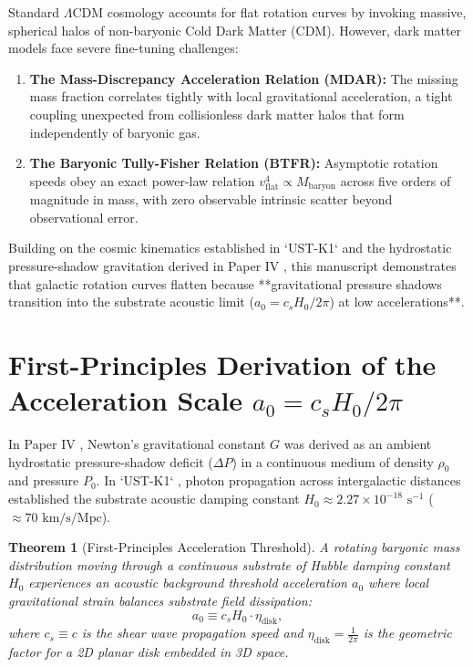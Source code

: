 \documentclass[11pt,a4paper]{article}
\newtheorem{thm}{Theorem}
\begin{document}
	Standard $\Lambda\text{CDM}$ cosmology accounts for flat rotation curves by invoking massive, spherical halos of non-baryonic Cold Dark Matter (CDM). However, dark matter models face severe fine-tuning challenges:
	\begin{enumerate}
		\item \textbf{The Mass-Discrepancy Acceleration Relation (MDAR):} The missing mass fraction correlates tightly with local gravitational acceleration, a tight coupling unexpected from collisionless dark matter halos that form independently of baryonic gas.
		\item \textbf{The Baryonic Tully-Fisher Relation (BTFR):} Asymptotic rotation speeds obey an exact power-law relation $v_{\text{flat}}^4 \propto M_{\text{baryon}}$ across five orders of magnitude in mass, with zero observable intrinsic scatter beyond observational error.
	\end{enumerate}
	
	Building on the cosmic kinematics established in `UST-K1` \cite{USTK1} and the hydrostatic pressure-shadow gravitation derived in Paper IV \cite{PaperIV}, this manuscript demonstrates that galactic rotation curves flatten because **gravitational pressure shadows transition into the substrate acoustic limit ($a_0 = c_s H_0 / 2\pi$) at low accelerations**.
	
	\section{First-Principles Derivation of the Acceleration Scale $a_0 = c_s H_0 / 2\pi$}
	\label{sec:a0_derivation}
	
	In Paper IV \cite{PaperIV}, Newton's gravitational constant $G$ was derived as an ambient hydrostatic pressure-shadow deficit ($\Delta P$) in a continuous medium of density $\rho_0$ and pressure $P_0$. In `UST-K1` \cite{USTK1}, photon propagation across intergalactic distances established the substrate acoustic damping constant $H_0 \approx 2.27 \times 10^{-18} \text{ s}^{-1}$ ($\approx 70 \text{ km/s/Mpc}$).
	
	\begin{thm}[First-Principles Acceleration Threshold]
		\label{thm:a0_derivation}
		A rotating baryonic mass distribution moving through a continuous substrate of Hubble damping constant $H_0$ experiences an acoustic background threshold acceleration $a_0$ where local gravitational strain balances substrate field dissipation:
		\begin{equation}
			a_0 \equiv c_s H_0 \cdot \eta_{\text{disk}},
			\label{eq:a0_first_principles_def}
		\end{equation}
		where $c_s \equiv c$ is the shear wave propagation speed and $\eta_{\text{disk}} = \frac{1}{2\pi}$ is the geometric factor for a 2D planar disk embedded in 3D space.
	\end{thm}
	
\end{document}
